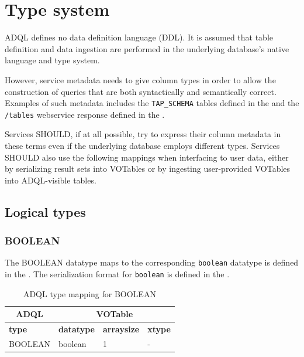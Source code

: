 \documentclass[11pt,a4paper]{ivoa}
\begin{document}
\clearpage
\section{Type system}
\label{sec:types}

ADQL defines no data definition language (DDL).
It is assumed that table definition and data ingestion are performed in
the underlying database's native language and type system.

However, service metadata needs to give column types in order to allow the
construction of queries that are both syntactically and semantically correct.
Examples of such metadata includes the \verb:TAP_SCHEMA: tables defined
in the \TAPSpec and the \verb:/tables:
webservice response defined in the \VOSISpec.

Services SHOULD, if at all possible, try to express their column metadata in
these terms even if the underlying database employs different types.
Services SHOULD also use the following mappings when interfacing to user data,
either by serializing result sets into VOTables or by ingesting user-provided
VOTables into ADQL-visible tables.

\subsection{Logical types}
\label{sec:types.logical}
\subsubsection{BOOLEAN}
\label{sec:types.logical.boolean}

The BOOLEAN datatype maps to the corresponding \verb:boolean: datatype is defined in the \DALISpec.
The serialization format for \verb:boolean: is defined in the \VOTableSpec.

\begin{table}[th]\footnotesize
    \begin{tabular}
        {|p{}|p{}|p{}|p{}|}
        \hline

        \hline
        \multicolumn{1}{|c|}{\textbf{ADQL}} &
        \multicolumn{3}{|c|}{\textbf{VOTable}}
        \tabularnewline
        
        \hline
        \textbf{type} &
        \textbf{datatype} &
        \textbf{arraysize} &
        \textbf{xtype}
        \tabularnewline

        \hline
        BOOLEAN &
        boolean &
        1 &
        -
        \tabularnewline

        \hline
    \end{tabular}
    \caption{ADQL type mapping for BOOLEAN}
    \label{table:types.logical.boolean}
\end{table}
\end{document}
